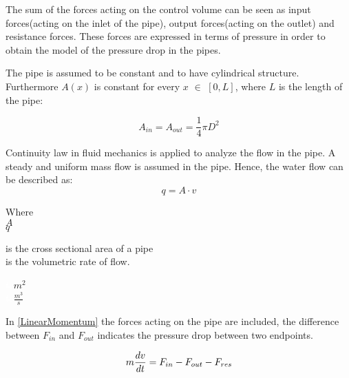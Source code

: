 The sum of the forces acting on the control volume can be seen as input forces(acting on the inlet of the pipe), output forces(acting on the outlet) and resistance forces.  
These forces are expressed in terms of pressure in order to obtain the model of the pressure drop in the pipes. 

The pipe is assumed to be constant and to have cylindrical structure. Furthermore $A(x)$ is constant for every $x$ $\in$ $[0,L]$, where $L$ is the length of the pipe:

\begin{equation}
  A_{in} = A_{out} = \frac{1}{4}\pi D^{2}
\end{equation}

Continuity law in fluid mechanics is applied to analyze the flow in the pipe.\cite{Hunt_Fluidmechanics} A steady and uniform mass flow is assumed in the pipe. Hence, the water flow can be described as: 
\begin{equation}
  q=A \cdot v
	\label{EquationOfContinuity}
\end{equation}

 \begin{minipage}[t]{0.20\textwidth}
Where\\
\hspace*{8mm} $A$ \\
\hspace*{8mm} $q$ 
\end{minipage}
\begin{minipage}[t]{0.68\textwidth}
\vspace*{2mm}
is the cross sectional area of a pipe\\
is the volumetric rate of flow.

\end{minipage}
\begin{minipage}[t]{0.10\textwidth}
\vspace*{2mm}
\textcolor{White}{te}$\unit{m^{2}}$\\
\textcolor{White}{te}$\unit{\frac{m^{3}}{s}}$
\end{minipage}

 In \eqref{LinearMomentum} the forces acting on the pipe are included, the difference between $F_{in}$ and $F_{out}$ indicates the pressure drop 
 between two endpoints.

\begin{equation}
  m \frac{dv}{dt} = F_{in} - F_{out} - F_{res} \\
  \label{LinearMomentum}
\end{equation}


